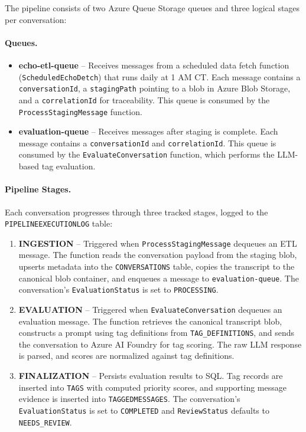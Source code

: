 \documentclass[12pt]{article}
\begin{document}
    The pipeline consists of two Azure Queue Storage queues and three logical stages per conversation:
    \paragraph{Queues.}
    \begin{itemize}
        \item \textbf{echo-etl-queue} -- Receives messages from a scheduled data fetch function (\texttt{ScheduledEchoDetch}) that runs daily at 1 AM CT. Each message contains a \texttt{conversationId}, a \texttt{stagingPath} pointing to a blob in Azure Blob Storage, and a \texttt{correlationId} for traceability. This queue is consumed by the \texttt{ProcessStagingMessage} function.
        
        \item \textbf{evaluation-queue} -- Receives messages after staging is complete. Each message contains a \texttt{conversationId} and \texttt{correlationId}. This queue is consumed by the \texttt{EvaluateConversation} function, which performs the LLM-based tag evaluation.
    \end{itemize}
    
    \paragraph{Pipeline Stages.} Each conversation progresses through three tracked stages, logged to the \texttt{PIPELINEEXECUTIONLOG} table:
    
    \begin{enumerate}
        \item \textbf{INGESTION} -- Triggered when \texttt{ProcessStagingMessage} dequeues an ETL message. The function reads the conversation payload from the staging blob, upserts metadata into the \texttt{CONVERSATIONS} table, copies the transcript to the canonical blob container, and enqueues a message to \texttt{evaluation-queue}. The conversation's \texttt{EvaluationStatus} is set to \texttt{PROCESSING}.
        
        \item \textbf{EVALUATION} -- Triggered when \texttt{EvaluateConversation} dequeues an evaluation message. The function retrieves the canonical transcript blob, constructs a prompt using tag definitions from \texttt{TAG\_DEFINITIONS}, and sends the conversation to Azure AI Foundry for tag scoring. The raw LLM response is parsed, and scores are normalized against tag definitions.
        
        \item \textbf{FINALIZATION} -- Persists evaluation results to SQL. Tag records are inserted into \texttt{TAGS} with computed priority scores, and supporting message evidence is inserted into \texttt{TAGGEDMESSAGES}. The conversation's \texttt{EvaluationStatus} is set to \texttt{COMPLETED} and \texttt{ReviewStatus} defaults to \texttt{NEEDS\_REVIEW}.
    \end{enumerate}
    
\end{document}
